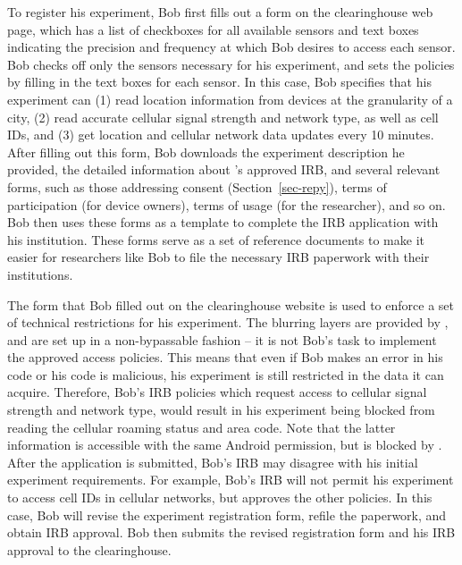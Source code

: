 To register his experiment, Bob first fills out a form on the clearinghouse 
web page, which has a list of checkboxes for all available sensors 
and text boxes indicating the precision and frequency at which Bob 
desires to access 
each sensor. Bob checks off only the sensors necessary for his experiment, 
and sets the policies by filling in the text boxes for each sensor.
In this case, Bob specifies that 
his experiment can (1) read location information
from devices at the granularity of a city, (2) read accurate
cellular signal strength and network type, as well as
cell IDs, and (3) get location and
cellular network data updates every 10 minutes. 
After filling out this form, Bob downloads the experiment description 
he provided, the detailed information about \sysname's approved IRB, 
and several relevant forms, such as those addressing consent 
(Section~\ref{sec-repy}), terms of participation (for device owners),  
terms of usage (for the researcher), and so on.  
Bob then uses these forms as a template to complete the IRB application 
with his institution. These forms serve as a set of reference documents 
to make it easier for researchers like Bob to 
file the necessary IRB paperwork with their institutions.

The form that Bob filled out on the clearinghouse website is used to
enforce a set of technical restrictions for his experiment. 
The blurring layers are provided by 
\sysname, and are set up in a non-bypassable fashion -- it is not 
Bob's task to implement the approved access policies. This means
that even if Bob makes an error in his code or his code is malicious, his 
experiment is still restricted in the data it can acquire. 
Therefore, Bob's IRB 
policies which request access to cellular signal strength and network type, would result 
in his experiment being blocked from reading the cellular roaming status and area 
code. Note that the latter information is accessible with the same 
Android permission, but is blocked by \sysname. 
After the application is submitted, Bob's IRB may disagree with 
his initial experiment requirements. For example, Bob's IRB will not permit
his experiment to access cell IDs in cellular networks, but 
approves the other policies. 
In this case, Bob will revise the experiment registration form, refile the paperwork, 
and obtain IRB approval. Bob then submits the revised  
registration form and his IRB approval to the clearinghouse.

